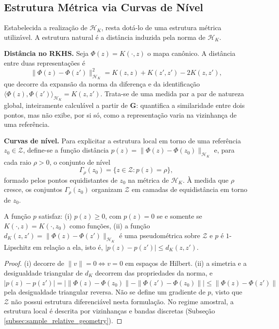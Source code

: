 \subsection{Estrutura Métrica via Curvas de Nível}\label{subsec:metric}
 
Estabelecida a realização de $\mathcal{H}_K$, resta dotá-lo de uma estrutura métrica utilizável. A estrutura natural é a distância induzida pela norma de $\mathcal{H}_K$.
 
\textbf{Distância no RKHS.} Seja $\Phi(z) = K(\cdot, z)$ o mapa canônico. A distância entre duas representações é
\begin{equation}\label{eq:rkhs_distance}
    \|\Phi(z) - \Phi(z')\|_{\mathcal{H}_K}^2 = K(z, z) + K(z', z') - 2 K(z, z'),
\end{equation}
que decorre da expansão da norma da diferença e da identificação $\langle \Phi(z), \Phi(z')\rangle_{\mathcal{H}_K} = K(z, z')$. Trata-se de uma medida par a par de natureza global, inteiramente calculável a partir de $\mathbf{G}$: quantifica a similaridade entre dois pontos, mas não exibe, por si só, como a representação varia na vizinhança de uma referência.
 
\textbf{Curvas de nível.} Para explicitar a estrutura local em torno de uma referência $z_0 \in \mathcal{Z}$, define-se a função distância $p(z) = \|\Phi(z) - \Phi(z_0)\|_{\mathcal{H}_K}$ e, para cada raio $\rho > 0$, o conjunto de nível
\begin{equation}\label{eq:level_curve}
    \Gamma_\rho(z_0) = \{ z \in \mathcal{Z} : p(z) = \rho \},
\end{equation}
formado pelos pontos equidistantes de $z_0$ na métrica de $\mathcal{H}_K$. À medida que $\rho$ cresce, os conjuntos $\Gamma_\rho(z_0)$ organizam $\mathcal{Z}$ em camadas de equidistância em torno de $z_0$.
 
\begin{proposition}[Propriedades de $p$]\label{prop:dist_props}
A função $p$ satisfaz: \textnormal{(i)} $p(z) \geq 0$, com $p(z) = 0$ se e somente se $K(\cdot, z) = K(\cdot, z_0)$ como funções, \textnormal{(ii)} a função $d_K(z,z')=\|\Phi(z)-\Phi(z')\|_{\mathcal{H}_K}$ é uma pseudométrica sobre $\mathcal{Z}$ e $p$ é $1$-Lipschitz em relação a ela, isto é, $|p(z)-p(z')|\leq d_K(z,z')$.
\end{proposition}
 
\begin{proof}
(i) decorre de $\|v\| = 0 \iff v = 0$ em espaços de Hilbert. (ii) a simetria e a desigualdade triangular de $d_K$ decorrem das propriedades da norma, e $|p(z)-p(z')|=\big|\|\Phi(z)-\Phi(z_0)\|-\|\Phi(z')-\Phi(z_0)\|\big|\leq\|\Phi(z)-\Phi(z')\|$ pela desigualdade triangular reversa. Não se define um gradiente de $p$, visto que $\mathcal{Z}$ não possui estrutura diferenciável nesta formulação. No regime amostral, a estrutura local é descrita por vizinhanças e bandas discretas (Subseção \ref{subsec:sample_relative_geometry}).
\end{proof}
 
